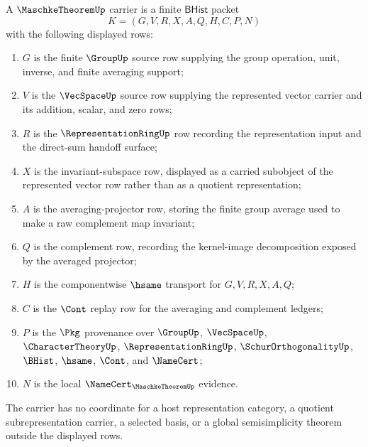 \begin{definition}
\label{def:maschke-theorem-carrier}
A $\MaschkeTheoremUp$ carrier is a finite $\mathsf{BHist}$ packet
$$
K=(G,V,R,X,A,Q,H,C,P,N)
$$
with the following displayed rows:
\begin{enumerate}
\item $G$ is the finite $\GroupUp$ source row supplying the group operation, unit, inverse, and finite averaging support;
\item $V$ is the $\VecSpaceUp$ source row supplying the represented vector carrier and its addition, scalar, and zero rows;
\item $R$ is the $\RepresentationRingUp$ row recording the representation input and the direct-sum handoff surface;
\item $X$ is the invariant-subspace row, displayed as a carried subobject of the represented vector row rather than as a quotient representation;
\item $A$ is the averaging-projector row, storing the finite group average used to make a raw complement map invariant;
\item $Q$ is the complement row, recording the kernel-image decomposition exposed by the averaged projector;
\item $H$ is the componentwise $\hsame$ transport for $G,V,R,X,A,Q$;
\item $C$ is the $\Cont$ replay row for the averaging and complement ledgers;
\item $P$ is the $\Pkg$ provenance over $\GroupUp$, $\VecSpaceUp$, $\CharacterTheoryUp$, $\RepresentationRingUp$, $\SchurOrthogonalityUp$, $\BHist$, $\hsame$, $\Cont$, and $\NameCert$;
\item $N$ is the local $\NameCert_{\MaschkeTheoremUp}$ evidence.
\end{enumerate}
The carrier has no coordinate for a host representation category, a quotient subrepresentation carrier, a selected basis, or a global semisimplicity theorem outside the displayed rows.
\end{definition}

